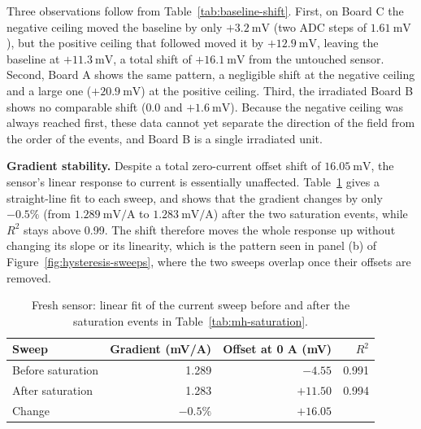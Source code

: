 \documentclass[12pt,a4paper]{article}
\begin{document}
Three observations follow from Table~\ref{tab:baseline-shift}. First, on Board C the negative ceiling moved the baseline by only $+\SI{3.2}{\milli\volt}$ (two ADC steps of $\SI{1.61}{\milli\volt}$), but the positive ceiling that followed moved it by $+\SI{12.9}{\milli\volt}$, leaving the baseline at $+\SI{11.3}{\milli\volt}$, a total shift of $+\SI{16.1}{\milli\volt}$ from the untouched sensor. Second, Board A shows the same pattern, a negligible shift at the negative ceiling and a large one ($+\SI{20.9}{\milli\volt}$) at the positive ceiling. Third, the irradiated Board B shows no comparable shift ($0.0$ and $+\SI{1.6}{\milli\volt}$). Because the negative ceiling was always reached first, these data cannot yet separate the direction of the field from the order of the events, and Board B is a single irradiated unit.

\textbf{Gradient stability.} Despite a total zero-current offset shift of $\SI{16.05}{\milli\volt}$, the sensor's linear response to current is essentially unaffected. Table~\ref{tab:mh-sweeps} gives a straight-line fit to each sweep, and shows that the gradient changes by only $-0.5\%$ (from $\SI{1.289}{\milli\volt\per\ampere}$ to $\SI{1.283}{\milli\volt\per\ampere}$) after the two saturation events, while $R^2$ stays above 0.99. The shift therefore moves the whole response up without changing its slope or its linearity, which is the pattern seen in panel (b) of Figure~\ref{fig:hysteresis-sweeps}, where the two sweeps overlap once their offsets are removed.

 
\begin{table}[h]
\centering
\caption{Fresh sensor: linear fit of the current sweep before and after the saturation events in Table~\ref{tab:mh-saturation}.}
\label{tab:mh-sweeps}
\small
\begin{tabular}{@{}lrrr@{}}
\toprule
Sweep & Gradient (mV/A) & Offset at 0 A (mV) & $R^2$ \\
\midrule
Before saturation & 1.289 & $-4.55$ & 0.991 \\
After saturation  & 1.283 & $+11.50$ & 0.994 \\
\midrule
Change & $-0.5\%$ & $+16.05$ & \\
\bottomrule
\end{tabular}
\end{table}
\end{document}
